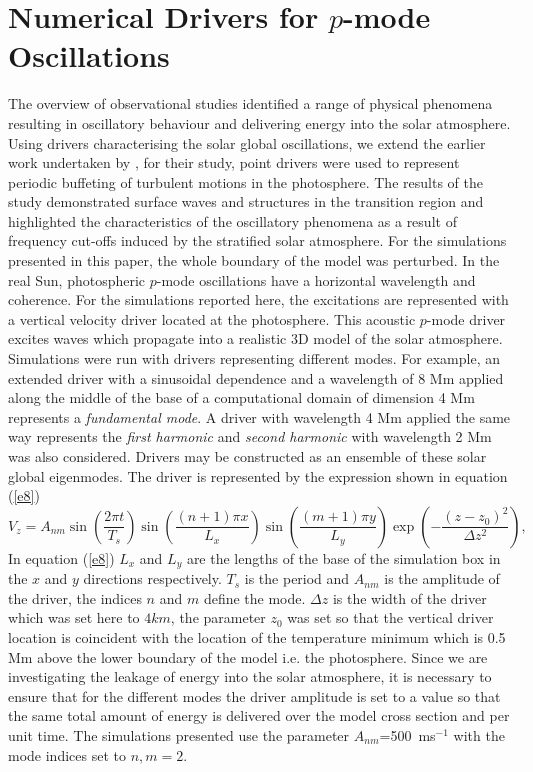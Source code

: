 \documentclass{aastex62}
\begin{document}
\section{Numerical Drivers for $p$-mode Oscillations}
 The overview of observational studies identified a range of physical phenomena resulting in oscillatory behaviour and delivering energy into the solar atmosphere.  Using drivers characterising the solar global oscillations, we extend the earlier work undertaken by  \citet{Malins2007A}, for their study, point drivers were used to represent periodic buffeting of turbulent motions in the photosphere. The results of the study demonstrated surface waves and structures in the transition region and highlighted the characteristics of the oscillatory phenomena as a result of frequency cut-offs induced by the stratified solar atmosphere. For the simulations presented in this paper, the whole boundary of the model was perturbed.  In the real Sun, photospheric $p$-mode oscillations have a horizontal wavelength and coherence. For the simulations reported here, the excitations are represented with a vertical velocity driver located at the photosphere. This acoustic $p$-mode driver excites waves which propagate 
into a realistic 3D model of the solar atmosphere. Simulations were run with drivers representing different modes. For example,  an extended driver with a sinusoidal dependence and a wavelength of 8 Mm applied along the 
middle of the base of a computational domain of dimension 4 Mm represents  a {\it fundamental mode}. 
A driver with wavelength 4 Mm applied the same way represents the {\it first harmonic} and {\it second harmonic} 
with wavelength 2 Mm was also considered. Drivers may be constructed as an ensemble of these solar 
global eigenmodes.  The driver is represented by the expression shown in equation (\ref{e8}) 
\begin{equation}
V_{z}=A_{nm} \sin\left(\frac{2\pi t}{T_s} \right)\sin\left(  \frac{(n+1)\pi x}{L_x} \right)  \sin\left(\frac{(m+1)\pi y}{L_y} \right)
\exp\left( -\frac{(z-z_0)^2}{\Delta z^2} \right),
\label{e8}
\end{equation}
In equation (\ref{e8}) $L_{x}$ and $L_{y}$ are the lengths of the base of the simulation box in the $x$ and $y$ directions respectively. $T_{s}$ is the period and $A_{nm}$ is the amplitude of the driver, the indices $n$ and $m$ define the mode. $\Delta z$ is the width of the driver which was set here to $4km$, the parameter $z_{0}$ was set so that the vertical driver location is coincident with the location of the temperature minimum which is 0.5 Mm above the lower boundary of the model i.e. the photosphere.   Since we are investigating the leakage of energy into the solar atmosphere, it is necessary to ensure that for the different modes the driver amplitude is set to a value so that the same total amount of energy is delivered over the model cross section and per unit time.  The simulations presented use the parameter $A_{nm}$=500\, ms$^{-1}$ with the mode indices set to $n,m=2$. 
\end{document}
